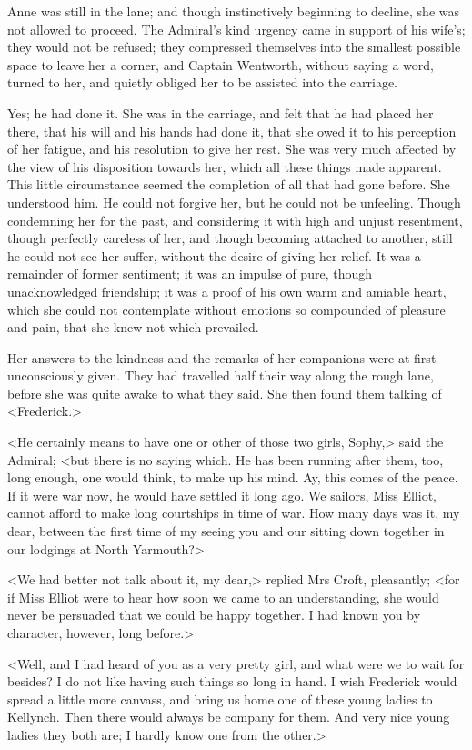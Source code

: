 Anne was still in the lane; and though instinctively beginning to decline, she was not allowed to proceed. The Admiral's kind urgency came in support of his wife's; they would not be refused; they compressed themselves into the smallest possible space to leave her a corner, and Captain Wentworth, without saying a word, turned to her, and quietly obliged her to be assisted into the carriage.

Yes; he had done it. She was in the carriage, and felt that he had placed her there, that his will and his hands had done it, that she owed it to his perception of her fatigue, and his resolution to give her rest. She was very much affected by the view of his disposition towards her, which all these things made apparent. This little circumstance seemed the completion of all that had gone before. She understood him. He could not forgive her, but he could not be unfeeling. Though condemning her for the past, and considering it with high and unjust resentment, though perfectly careless of her, and though becoming attached to another, still he could not see her suffer, without the desire of giving her relief. It was a remainder of former sentiment; it was an impulse of pure, though unacknowledged friendship; it was a proof of his own warm and amiable heart, which she could not contemplate without emotions so compounded of pleasure and pain, that she knew not which prevailed.

Her answers to the kindness and the remarks of her companions were at first unconsciously given. They had travelled half their way along the rough lane, before she was quite awake to what they said. She then found them talking of <Frederick.>

<He certainly means to have one or other of those two girls, Sophy,> said the Admiral; <but there is no saying which. He has been running after them, too, long enough, one would think, to make up his mind. Ay, this comes of the peace. If it were war now, he would have settled it long ago. We sailors, Miss Elliot, cannot afford to make long courtships in time of war. How many days was it, my dear, between the first time of my seeing you and our sitting down together in our lodgings at North Yarmouth?>

<We had better not talk about it, my dear,> replied Mrs Croft, pleasantly; <for if Miss Elliot were to hear how soon we came to an understanding, she would never be persuaded that we could be happy together. I had known you by character, however, long before.>

<Well, and I had heard of you as a very pretty girl, and what were we to wait for besides? I do not like having such things so long in hand. I wish Frederick would spread a little more canvass, and bring us home one of these young ladies to Kellynch. Then there would always be company for them. And very nice young ladies they both are; I hardly know one from the other.>

